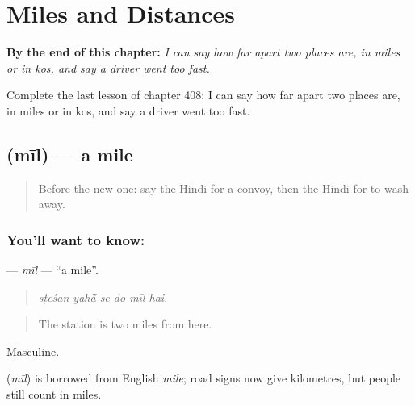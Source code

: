
\chapter{Miles and Distances}
\label{ch:hi-miles-and-distances}

\begin{chapteropening}
\textbf{By the end of this chapter:} \emph{I can say how far apart two places are, in miles or in kos, and say a driver went too fast.}

Complete the last lesson of chapter 408: I can say how far apart two places are, in miles or in kos, and say a driver went too fast.
\end{chapteropening}

\section[\texorpdfstring{\hi{मील} (mīl)}{मील (mīl)}]{ (mīl) — a mile}

\label{lesson:HI-C408-mil}



\begin{quote}
Before the new one: say the Hindi for a convoy, then the Hindi for to wash away.
\end{quote}

\subsection*{You'll want to know: }
\textbf{} — \emph{mīl} — \textquotedblleft{}a mile\textquotedblright{}.

\begin{quote}
     
\end{quote}

\begin{quote}
\emph{sṭeśan yahā̃ se do mīl hai.}
\end{quote}

\begin{quote}
The station is two miles from here.
\end{quote}

Masculine.

\begin{cousinweb}
\textbf{} (\emph{mīl}) is borrowed from English \emph{mile}; road signs now give kilometres, but people still count in miles.
\end{cousinweb}


